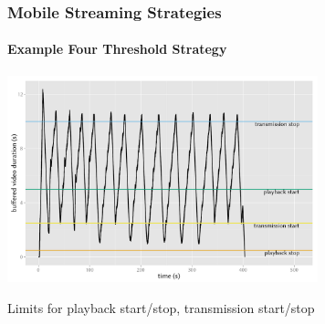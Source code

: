 \documentclass{beamer}
\begin{document}
\begin{frame}
	\frametitle{Mobile Streaming Strategies}
	\framesubtitle{Example Four Threshold Strategy}



		\begin{center}
			\includegraphics[height=6cm]{../../chapters/06-mobilestreamingmeasurements/images/R-ltesim-plotbuffer-time.pdf}

			Limits for playback start/stop, transmission start/stop
		\end{center}
		




\end{frame}



\begin{frame}
\end{frame}
\end{document}
